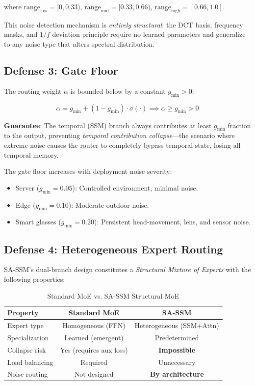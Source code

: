 \documentclass[conference]{IEEEtran}
\begin{document}
where $\text{range}_{\text{low}} = [0, 0.33)$, $\text{range}_{\text{mid}} = [0.33, 0.66)$, $\text{range}_{\text{high}} = [0.66, 1.0]$.

This noise detection mechanism is \emph{entirely structural}: the DCT basis, frequency masks, and $1/f$ deviation principle require no learned parameters and generalize to any noise type that alters spectral distribution.

\subsection{Defense 3: Gate Floor}

The routing weight $\alpha$ is bounded below by a constant $g_{\min} > 0$:

\begin{equation}
\alpha = g_{\min} + (1 - g_{\min}) \cdot \sigma(\cdot) \implies \alpha \geq g_{\min} > 0
\label{eq:gate_floor}
\end{equation}

\textbf{Guarantee}: The temporal (SSM) branch always contributes at least $g_{\min}$ fraction to the output, preventing \emph{temporal contribution collapse}---the scenario where extreme noise causes the router to completely bypass temporal state, losing all temporal memory.

The gate floor increases with deployment noise severity:
\begin{itemize}
\item Server ($g_{\min}=0.05$): Controlled environment, minimal noise.
\item Edge ($g_{\min}=0.10$): Moderate outdoor noise.
\item Smart glasses ($g_{\min}=0.20$): Persistent head-movement, lens, and sensor noise.
\end{itemize}

\subsection{Defense 4: Heterogeneous Expert Routing}

SA-SSM's dual-branch design constitutes a \emph{Structural Mixture of Experts} with the following properties:

\begin{table}[t]
\centering
\caption{Standard MoE vs. SA-SSM Structural MoE}
\label{tab:moe_comparison}
\small
\begin{tabular}{@{}lcc@{}}
\toprule
Property & Standard MoE & SA-SSM \\
\midrule
Expert type & Homogeneous (FFN) & Heterogeneous (SSM+Attn) \\
Specialization & Learned (emergent) & Predetermined \\
Collapse risk & Yes (requires aux loss) & \textbf{Impossible} \\
Load balancing & Required & Unnecessary \\
Noise routing & Not designed & \textbf{By architecture} \\
\bottomrule
\end{tabular}
\end{table}
\end{document}
